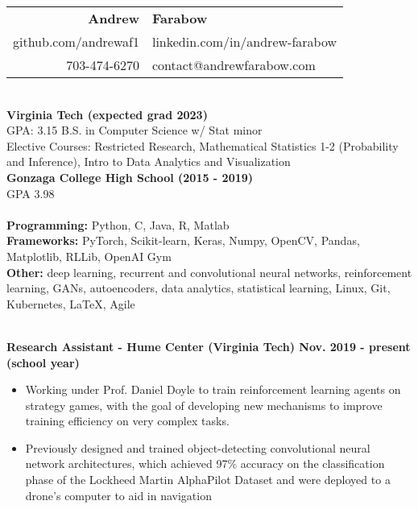 \documentclass{article}
\begin{document}
  \begin{center}
    \begin{tabular}{r l}
      {\huge\textbf{Andrew}} & {\huge\textbf{Farabow}} \\
      \hspace{35pt} github.com/andrewaf1 & linkedin.com/in/andrew-farabow \\
      703-474-6270 & contact@andrewfarabow.com \\
    \end{tabular}


  \begin{flushleft}
    \begin{multicols}{2}
      {\large\textbf{\underline{}}} \\
      \textbf{Virginia Tech (expected grad 2023)} \\
      GPA: 3.15 \; B.S. in Computer Science w/ Stat minor \\
      Elective Courses: Restricted Research, Mathematical Statistics 1-2 (Probability and Inference), Intro to Data Analytics and Visualization\\
      \textbf{Gonzaga College High School	(2015 - 2019)} \\
      GPA 3.98 \\
     

    \columnbreak
    {\large\textbf{\underline{}}} \\
    {\textbf{Programming:}} Python, C, Java, R, Matlab \\
    {\textbf{Frameworks:}} PyTorch, Scikit-learn, Keras, Numpy, OpenCV, Pandas, Matplotlib, RLLib, OpenAI Gym \\
    {\textbf{Other:}} deep learning, recurrent and convolutional neural networks, reinforcement learning, GANs, autoencoders, data analytics, statistical learning, Linux, Git, Kubernetes, LaTeX, Agile \\

    \end{multicols}

    {\large\textbf{\underline{}}} \\
    
    \textbf{Research Assistant - Hume Center (Virginia Tech) \hfill Nov. 2019 - present (school year)}
    \begin{itemize}
      \itemsep0em
      \item Working under Prof. Daniel Doyle to train reinforcement learning agents on strategy games, with the goal of developing new mechanisms to improve training efficiency on very complex tasks. 
      \item Previously designed and trained object-detecting convolutional neural network architectures, which achieved 97\% accuracy on the classification phase of the Lockheed Martin AlphaPilot Dataset and were deployed to a drone's computer to aid in navigation
    \end{itemize}


\end{flushleft}
\end{center}
\end{document}
